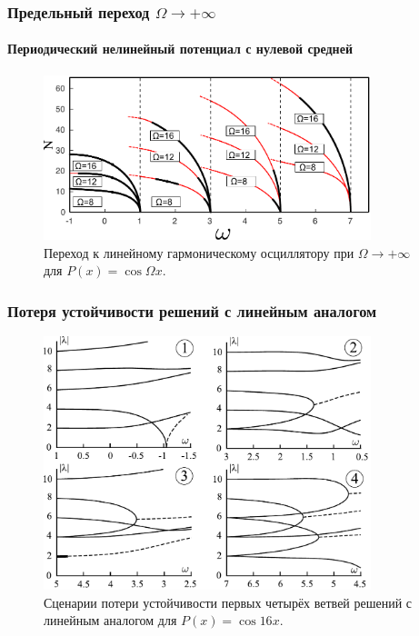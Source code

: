 \documentclass [10pt] {beamer}
\begin{document}
\begin{frame}
	\frametitle{Предельный переход $\Omega \to +\infty$}
	\framesubtitle{Периодический нелинейный потенциал с нулевой средней}
	
	\begin{figure}
		\includegraphics[width=0.85\textwidth]{pic/linear_oscillator_limit.pdf}
		\caption{Переход к линейному гармоническому осциллятору при $\Omega \to +\infty$ для $P(x) = \cos \Omega x$.}
		\label{pic:linear_limit}
	\end{figure}
\end{frame}

\begin{frame}
	\frametitle{Потеря устойчивости решений с линейным аналогом}
	
	\begin{figure}
		\includegraphics[width=0.85\textwidth]{pic/stability_loss.pdf}
		\caption{Сценарии потери устойчивости первых четырёх ветвей  решений с линейным аналогом для $P(x) = \cos 16 x$.}
		\label{pic:stability_loss}
	\end{figure}
\end{frame}
\end{document}
